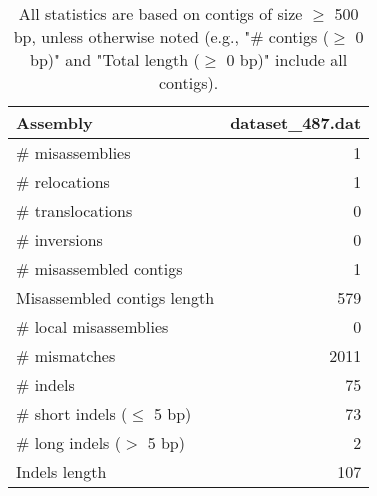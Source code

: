 \documentclass[12pt,a4paper]{article}
\begin{document}
\begin{table}[ht]
\begin{center}
\caption{All statistics are based on contigs of size $\geq$ 500 bp, unless otherwise noted (e.g., "\# contigs ($\geq$ 0 bp)" and "Total length ($\geq$ 0 bp)" include all contigs).}
\begin{tabular}{|l*{1}{|r}|}
\hline
Assembly & dataset\_487.dat \\ \hline
\# misassemblies & 1 \\ \hline
\hspace{5mm}\# relocations & 1 \\ \hline
\hspace{5mm}\# translocations & 0 \\ \hline
\hspace{5mm}\# inversions & 0 \\ \hline
\# misassembled contigs & 1 \\ \hline
Misassembled contigs length & 579 \\ \hline
\# local misassemblies & 0 \\ \hline
\# mismatches & 2011 \\ \hline
\# indels & 75 \\ \hline
\hspace{5mm}\# short indels ($\leq$ 5 bp) & 73 \\ \hline
\hspace{5mm}\# long indels ($>$ 5 bp) & 2 \\ \hline
Indels length & 107 \\ \hline
\end{tabular}
\end{center}
\end{table}
\end{document}
